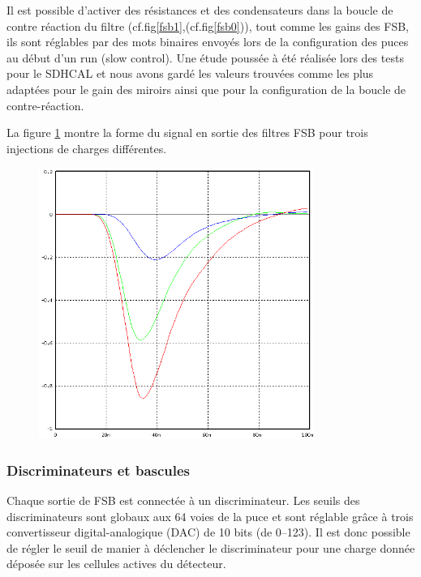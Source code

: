 Il est possible d'activer des résistances et des condensateurs dans la boucle de contre réaction du filtre (cf.fig\ref{fsb1},(cf.fig\ref{fsb0})), tout comme les gains des FSB, ils sont réglables par des mots binaires envoyés lors de la configuration des puces au début d'un run (slow control). Une étude poussée à été réalisée lors des tests pour le SDHCAL et nous avons gardé les valeurs trouvées comme les plus adaptées pour le gain des miroirs ainsi que pour la configuration de la boucle de contre-réaction.

La figure \ref{signal} montre la forme du signal en sortie des filtres FSB pour trois injections de charges différentes.
\begin{figure}[ht!]
	\centering
	\includegraphics[width=0.8\textwidth]{GLA/SIGNAL.png}
	\label{signal}
\end{figure}

\subsubsection{Discriminateurs et bascules}
Chaque sortie de FSB est connectée à un discriminateur. Les seuils des discriminateurs sont globaux aux \num{64} voies de la puce et sont réglable grâce à trois convertisseur digital-analogique (DAC) de \num{10} bits (de \SIrange{0}{123}{}). Il est donc possible de régler le seuil de manier à déclencher le discriminateur pour une charge donnée déposée sur les cellules actives du détecteur.

